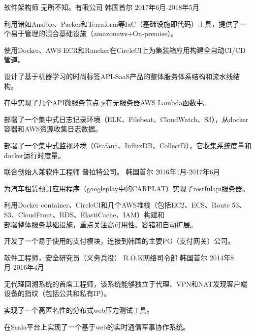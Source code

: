 

\begin{cventries}

  \cventry
    {软件架构师} %
    {无所不知。有限公司} %
    {韩国首尔} %
    {2017年6月-2018年5月} %
    {
      \begin{cvitems} %
        \item {利用诸如Ansible、Packer和Terraform等IaC（基础设施即代码）工具，提供了一个易于管理的混合基础设施（amazonaws+On-premise）。}
        \item {使用Docker、AWS ECR和Rancher在CircleCI上为集装箱应用构建全自动CI/CD管道。}
        \item {设计了基于机器学习的时尚标签API-SaaS产品的整体服务体系结构和流水线结构。}
        \item {在中实现了几个API微服务节点.js在无服务器AWS Lambda函数中。}
        \item {部署了一个集中式日志记录环境（ELK、Filebeat、CloudWatch、S3），从docker容器和AWS资源收集日志数据。}
        \item {部署了一个集中式监视环境（Grafana、InfluxDB、CollectD），它收集系统度量和docker运行时度量。}
      \end{cvitems}
    }

  \cventry
    {联合创始人兼软件工程师} %
    {普拉特公司。} %
    {韩国首尔} %
    {2016年1月-2017年6月} %
    {
      \begin{cvitems} %
        \item {为汽车租赁预订应用程序（googleplay中的CARPLAT）实现了restfulapi服务器。}
        \item {利用Docker container、CircleCI和几个AWS堆栈（包括EC2、ECS、Route 53、S3、CloudFront、RDS、ElastiCache、IAM）构建和\\部署整体服务基础设施，重点关注高可用性、容错和自动扩展。}
        \item {开发了一个易于使用的支付模块，连接到韩国的主要PG（支付网关）公司。}
      \end{cvitems}
    }

  \cventry
    {软件工程师，安全研究员（义务兵役）} %
    {R.O.K网络司令部} %
    {韩国首尔} %
    {2014年8月-2016年4月} %
    {
      \begin{cvitems} %
        \item {无代理回溯系统的首席工程师，该系统能够独立于代理、VPN和NAT发现客户端设备的指纹（包括公共和私有IP）。}
        \item {实现了一个高匿名性的分布式web压力测试工具。}
        \item {在Scala平台上实现了一个基于web的实时通信军事协作系统。}
      \end{cvitems}
    }


\end{cventries}

